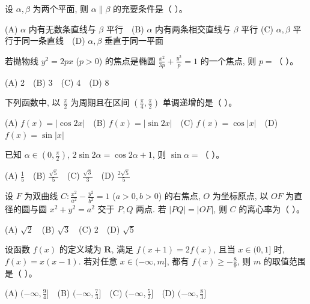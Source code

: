 \begin{question}
设 $\alpha, \beta$ 为两个平面, 则 $\alpha \parallel \beta$ 的充要条件是（ ）。

(A) $\alpha$ 内有无数条直线与 $\beta$ 平行　(B) $\alpha$ 内有两条相交直线与 $\beta$ 平行
(C) $\alpha, \beta$ 平行于同一条直线　(D) $\alpha, \beta$ 垂直于同一平面

\end{question}
\begin{question}
若抛物线 $y^2 = 2px$ ($p > 0$) 的焦点是椭圆 $\frac{x^2}{3p} + \frac{y^2}{p} = 1$ 的一个焦点, 则 $p =$（ ）。

(A) 2　(B) 3　(C) 4　(D) 8

\end{question}
\begin{question}
下列函数中, 以 $\frac{\pi}{2}$ 为周期且在区间 $(\frac{\pi}{4}, \frac{\pi}{2})$ 单调递增的是（ ）。

(A) $f(x) = |\cos 2x|$　(B) $f(x) = |\sin 2x|$　(C) $f(x) = \cos |x|$　(D) $f(x) = \sin |x|$

\end{question}
\begin{question}
已知 $\alpha \in (0, \frac{\pi}{2})$, $2\sin 2\alpha = \cos 2\alpha + 1$, 则 $\sin\alpha =$（ ）。

(A) $\frac{1}{5}$　(B) $\frac{\sqrt{5}}{5}$　(C) $\frac{\sqrt{3}}{3}$　(D) $\frac{2\sqrt{5}}{5}$

\end{question}
\begin{question}
设 $F$ 为双曲线 $C: \frac{x^2}{a^2} - \frac{y^2}{b^2} = 1$ ($a > 0, b > 0$) 的右焦点, $O$ 为坐标原点, 以 $OF$ 为直径的圆与圆 $x^2 + y^2 = a^2$ 交于 $P, Q$ 两点. 若 $|PQ| = |OF|$, 则 $C$ 的离心率为（ ）。

(A) $\sqrt{2}$　(B) $\sqrt{3}$　(C) 2　(D) $\sqrt{5}$

\end{question}
\begin{question}
设函数 $f(x)$ 的定义域为 $\mathbf{R}$, 满足 $f(x+1) = 2f(x)$, 且当 $x \in (0, 1]$ 时, $f(x) = x(x-1)$. 若对任意 $x \in (-\infty, m]$, 都有 $f(x) \geqslant -\frac{8}{9}$, 则 $m$ 的取值范围是（ ）。

(A) $(-\infty, \frac{9}{4}]$　(B) $(-\infty, \frac{7}{3}]$　(C) $(-\infty, \frac{5}{2}]$　(D) $(-\infty, \frac{8}{3}]$

\par\medskip

\end{question}

